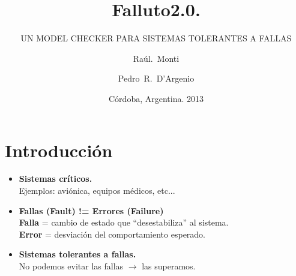\documentclass[serif]{beamer}
\title[Falluto2.0] %
{Falluto2.0.}
\subtitle{ UN MODEL CHECKER PARA SISTEMAS TOLERANTES A FALLAS}
\author[Monti] %
{Raúl.~Monti \and Pedro~R.~D'Argenio}
\institute[FaMAF - UNC] %
{
Facultad de Matem\'atica, Astronom\'ia y F\'isica, Universidad Nacional de 
Córdoba
}
\date[4-2-2013] %
{Córdoba, Argentina. 2013}
\begin{document}
\frame{\titlepage}


\section[Intro]{Introducción}


\begin{frame}
\begin{itemize}\itemsep15pt
\item {\Large \bfseries Sistemas críticos.}\\[5pt]
\hspace{0.5cm}Ejemplos: aviónica, equipos médicos, etc...
\item {\Large \bfseries Fallas (Fault) != Errores (Failure)}\\[5pt]
\hspace{0.5cm}\textbf{Falla} = cambio de estado que ``desestabiliza'' al sistema.\\[5pt]
\hspace{0.5cm}\textbf{Error} = desviación del comportamiento esperado.
\item {\Large \bfseries Sistemas tolerantes a fallas.}\\[5pt]
\hspace{0.5cm}No podemos evitar las fallas $\longrightarrow$ las superamos.
\end{itemize}
\end{frame}
\end{document}
